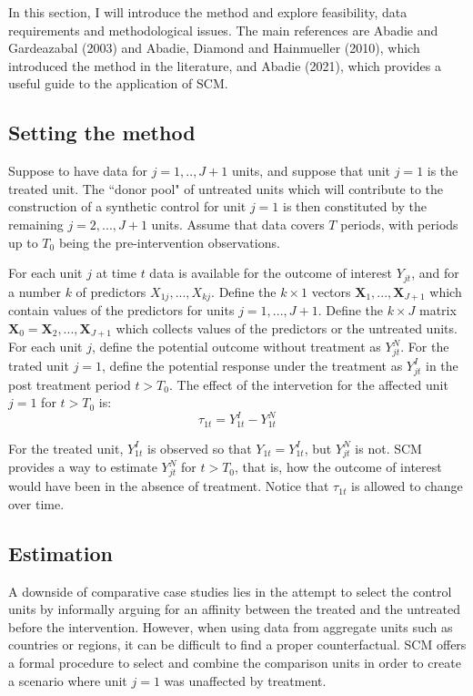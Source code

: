 \documentclass[12pt,a4paper,draft]{article}
\begin{document}
In this section, I will introduce the method and explore feasibility, 
data requirements and methodological issues. 
The main references are Abadie and Gardeazabal (2003) and Abadie, Diamond and 
Hainmueller (2010), which introduced the method in the literature, and Abadie 
(2021), which provides a useful guide to the application of SCM.


\subsection{Setting the method}

Suppose to have data for $j=1,..,J+1$ units, and suppose that unit $j=1$ is the 
treated unit. The ``donor pool" of untreated units which will contribute to the 
construction of a synthetic control for unit $j=1$ is then constituted by the 
remaining $j=2,...,J+1$ units.
Assume that data covers $T$ periods, with periods up to $T_0$ being the 
pre-intervention observations.

For each unit $j$ at time $t$ data is available for the outcome of interest 
$Y_{jt}$, and for a number $k$ of predictors $X_{1j}, ..., X_{kj}$. Define the 
$k \times 1$ vectors $\mathbf{X}_1, ..., \mathbf{X}_{J+1}$ which contain values
of the predictors for units $j=1,...,J+1$. Define the $k \times J$ matrix 
$\mathbf{X}_0={\mathbf{X}_2,..., \mathbf{X}_{J+1}}$ which collects values of the predictors 
or the untreated units.
For each unit $j$, define the potential outcome without treatment as $Y_{jt}^N$.
For the trated unit $j=1$, define the potential response under the treatment as 
$Y_{jt}^I$ in the post treatment period $t>T_0$. The effect of the intervetion 
for the affected unit $j=1$ for $t>T_0$ is: 
\begin{equation}
\tau_{1t}=Y_{1t}^I-Y_{1t}^N
\end{equation}

For the treated unit, $Y_{1t}^I$ is observed so that  $Y_{1t}=Y_{1t}^I$, but $Y_{jt}^N$ is not. 
SCM provides a way to estimate $Y_{jt}^N$ for $t>T_0$, that is, how the outcome 
of interest would have been in the absence of treatment. Notice that $\tau_{1t}$
is allowed to change over time.


\subsection{Estimation}

A downside of comparative case studies lies in the attempt to select the control 
units by informally arguing for an affinity between the treated and the untreated 
before the intervention. However, when using data from aggregate units such as 
countries or regions, it can be difficult to find a proper counterfactual.
SCM offers a formal procedure to select and combine the comparison units in order
to create a scenario where unit $j=1$ was unaffected by treatment.
\end{document}

